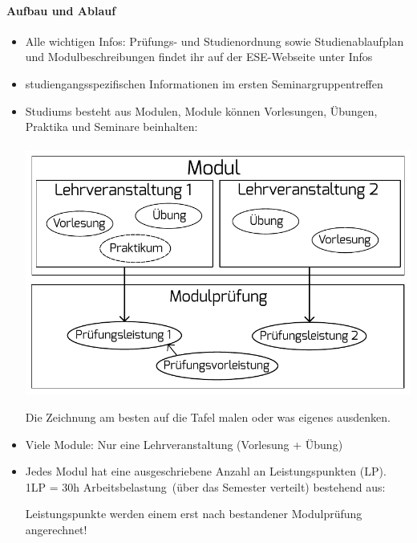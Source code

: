 \documentclass[a4paper,12pt]{report}
\begin{document}
\paragraph{Aufbau und Ablauf}
\begin{itemize}
	\item Alle wichtigen Infos: Prüfungs- und Studienordnung sowie Studienablaufplan und Modulbeschreibungen findet ihr auf der ESE-Webseite unter Infos
	\item studiengangsspezifischen Informationen im ersten Seminargruppentreffen
	\item Studiums besteht aus Modulen, Module können Vorlesungen, Übungen, Praktika und Seminare beinhalten:\\\\
	\includegraphics[width=\linewidth]{./modul.pdf}
	\begin{center}
	Die Zeichnung am besten auf die Tafel malen oder was eigenes ausdenken.
	\end{center}
	\item Viele Module: Nur eine Lehrveranstaltung (Vorlesung + Übung)
	\item Jedes Modul hat eine ausgeschriebene Anzahl an Leistungspunkten (LP).\\
	1LP = 30h \glqq Arbeitsbelastung\grqq\ (über das Semester verteilt) bestehend aus:
	Leistungspunkte werden einem erst nach bestandener Modulprüfung angerechnet!
\end{itemize}
\end{document}
